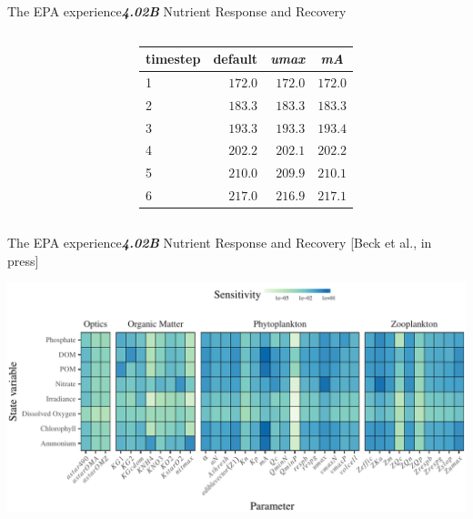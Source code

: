 \documentclass[serif]{beamer}\usepackage[]{graphicx}\usepackage[]{color}
\newcommand{\emtxt}[1]{\textbf{\textit{#1}}}
\begin{document}
\begin{frame}{The EPA experience}{\emtxt{4.02B} Nutrient Response and Recovery}
\begin{columns}
\begin{column}{0.5\textwidth}
{}



\end{column}
\begin{column}{0.5\textwidth}
\begin{table}[!tbp]
{\scriptsize
\begin{center}
\begin{tabular}{lrrr}
\hline\hline
\multicolumn{1}{l}{timestep}&\multicolumn{1}{c}{default}&\multicolumn{1}{c}{\textit{umax}}&\multicolumn{1}{c}{\textit{mA}}\tabularnewline
\hline
1&$172.0$&$172.0$&$172.0$\tabularnewline
2&$183.3$&$183.3$&$183.3$\tabularnewline
3&$193.3$&$193.3$&$193.4$\tabularnewline
4&$202.2$&$202.1$&$202.2$\tabularnewline
5&$210.0$&$209.9$&$210.1$\tabularnewline
6&$217.0$&$216.9$&$217.1$\tabularnewline
\hline
\end{tabular}\end{center}}
\end{table}

\end{column}
\end{columns}
\end{frame}



\begin{frame}{The EPA experience}{\emtxt{4.02B} Nutrient Response and Recovery {\footnotesize [Beck et al., in press]}}
\centerline{\includegraphics[width=\textwidth]{fig/senstile.pdf}}
\end{frame}
\end{document}
